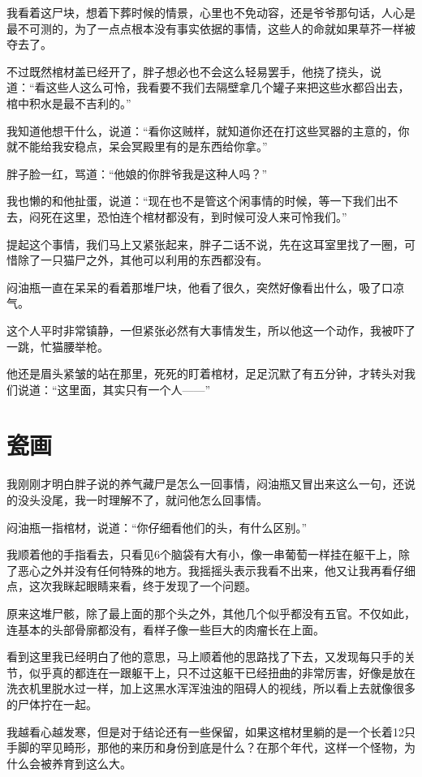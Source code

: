 我看着这尸块，想着下葬时候的情景，心里也不免动容，还是爷爷那句话，人心是最不可测的，为了一点点根本没有事实依据的事情，这些人的命就如果草芥一样被夺去了。

不过既然棺材盖已经开了，胖子想必也不会这么轻易罢手，他挠了挠头，说道：“看这些人这么可怜，我看要不我们去隔壁拿几个罐子来把这些水都舀出去，棺中积水是最不吉利的。”

我知道他想干什么，说道：“看你这贼样，就知道你还在打这些冥器的主意的，你就不能给我安稳点，呆会冥殿里有的是东西给你拿。”

胖子脸一红，骂道：“他娘的你胖爷我是这种人吗？”

我也懒的和他扯蛋，说道：“现在也不是管这个闲事情的时候，等一下我们出不去，闷死在这里，恐怕连个棺材都没有，到时候可没人来可怜我们。”

提起这个事情，我们马上又紧张起来，胖子二话不说，先在这耳室里找了一圈，可惜除了一只猫尸之外，其他可以利用的东西都没有。

闷油瓶一直在呆呆的看着那堆尸块，他看了很久，突然好像看出什么，吸了口凉气。

这个人平时非常镇静，一但紧张必然有大事情发生，所以他这一个动作，我被吓了一跳，忙猫腰举枪。

他还是眉头紧皱的站在那里，死死的盯着棺材，足足沉默了有五分钟，才转头对我们说道：“这里面，其实只有一个人——”

\chapter{瓷画}

我刚刚才明白胖子说的养气藏尸是怎么一回事情，闷油瓶又冒出来这么一句，还说的没头没尾，我一时理解不了，就问他怎么回事情。

闷油瓶一指棺材，说道：“你仔细看他们的头，有什么区别。”

我顺着他的手指看去，只看见6个脑袋有大有小，像一串葡萄一样挂在躯干上，除了恶心之外并没有任何特殊的地方。我摇摇头表示我看不出来，他又让我再看仔细点，这次我眯起眼睛来看，终于发现了一个问题。

原来这堆尸骸，除了最上面的那个头之外，其他几个似乎都没有五官。不仅如此，连基本的头部骨廓都没有，看样子像一些巨大的肉瘤长在上面。

看到这里我已经明白了他的意思，马上顺着他的思路找了下去，又发现每只手的关节，似乎真的都连在一跟躯干上，只不过这躯干已经扭曲的非常厉害，好像是放在洗衣机里脱水过一样，加上这黑水浑浑浊浊的阻碍人的视线，所以看上去就像很多的尸体拧在一起。

我越看心越发寒，但是对于结论还有一些保留，如果这棺材里躺的是一个长着12只手脚的罕见畸形，那他的来历和身份到底是什么？在那个年代，这样一个怪物，为什么会被养育到这么大。

